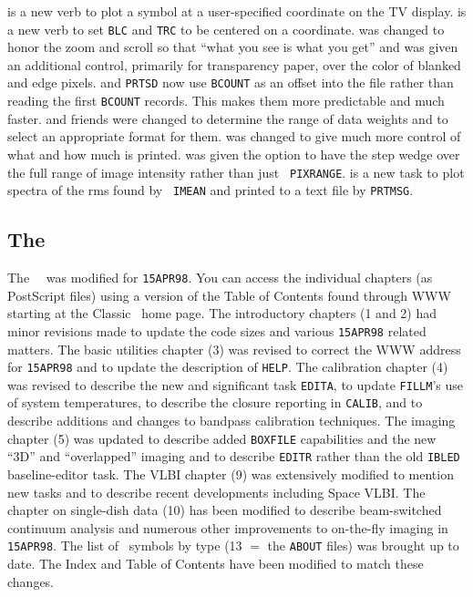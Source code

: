 \begin{description}
 is a new verb to plot a symbol at a user-specified
   coordinate on the TV display.
 is a new verb to set {\tt BLC} and {\tt TRC} to be
   centered on a coordinate.
 was changed to honor the zoom and scroll so that ``what
   you see is what you get'' and was given an additional control,
   primarily for transparency paper, over the color of blanked and
   edge pixels.
 and {\tt PRTSD} now use {\tt BCOUNT} as an offset into
   the file rather than reading the first {\tt BCOUNT} records.  This
   makes them more predictable and much faster.
 and friends were changed to determine the range of data
   weights and to select an appropriate format for them.
 was changed to give much more control of what and how
   much is printed.
 was given the option to have the step wedge over the
   full range of image intensity rather than just \hbox{{\tt
   PIXRANGE}}.
 is a new task to plot spectra of the rms found by {\tt
   IMEAN} and printed to a text file by \hbox{{\tt PRTMSG}}.
\end{description}

\subsection{The \Cookbook}

The \AIPS\ \Cookbook\ was modified for \hbox{{\tt 15APR98}}.  You can
access the individual chapters (as PostScript files) using a version
of the Table of Contents found through WWW starting at the Classic
\AIPS\ home page.  The introductory chapters (1 and 2) had minor
revisions made to update the code sizes and various {\tt 15APR98}
related matters.  The basic utilities chapter (3) was revised to
correct the WWW address for {\tt 15APR98} and to update the
description of \hbox{{\tt HELP}}.  The calibration chapter (4) was
revised to describe the new and significant task {\tt EDITA}, to
update {\tt FILLM}'s use of system temperatures, to describe the
closure reporting in {\tt CALIB}, and to describe additions and
changes to bandpass calibration techniques.  The imaging chapter (5)
was updated to describe added {\tt BOXFILE} capabilities and the new
``3D'' and ``overlapped'' imaging and to describe {\tt EDITR} rather
than the old {\tt IBLED} baseline-editor task.  The VLBI chapter (9)
was extensively modified to mention new tasks and to describe recent
developments including Space \hbox{VLBI}.  The chapter on single-dish
data (10) has been modified to describe beam-switched continuum
analysis and numerous other improvements to on-the-fly imaging in
\hbox{{\tt 15APR98}}.  The list of \AIPS\ symbols by type (13 $=$ the
{\tt ABOUT} files) was brought up to date.  The Index and Table of
Contents have been modified to match these changes.
\vfill\eject

